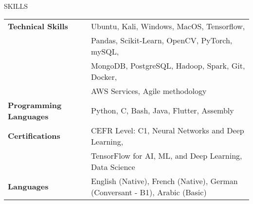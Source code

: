 \documentclass{resume} %
\begin{document}
\begin{rSection}{SKILLS}

\begin{tabular}{ @{} >{\bfseries}l @{\hspace{6ex}} l }
Technical Skills & Ubuntu, Kali, Windows, MacOS, Tensorﬂow, \\
& Pandas, Scikit-Learn, OpenCV, PyTorch, mySQL, \\
& MongoDB, PostgreSQL, Hadoop, Spark, Git, Docker, \\
& AWS Services, Agile methodology \\
Programming Languages & Python, C, Bash, Java, Flutter, Assembly\\
Certifications & CEFR Level: C1, Neural Networks and Deep Learning, \\
& TensorFlow for AI, ML, and Deep Learning, Data Science\\
Languages & English (Native), French (Native), German (Conversant - B1), Arabic (Basic)\\
\end{tabular}\\
\end{rSection}

\end{document}
